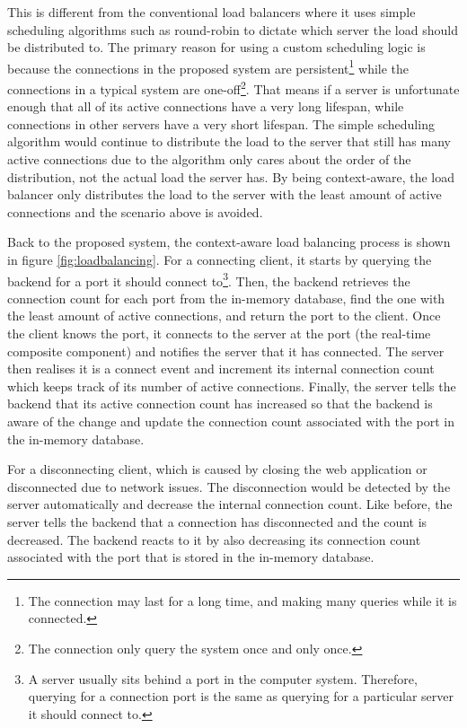 \documentclass[../thesis.tex]{subfiles}
\begin{document}
This is different from the conventional load balancers where it uses simple scheduling algorithms such as round-robin to dictate which server the load should be distributed to. The primary reason for using a custom scheduling logic is because the connections in the proposed system are persistent\footnote{The connection may last for a long time, and making many queries while it is connected.} while the connections in a typical system are one-off\footnote{The connection only query the system once and only once.}. That means if a server is unfortunate enough that all of its active connections have a very long lifespan, while connections in other servers have a very short lifespan. The simple scheduling algorithm would continue to distribute the load to the server that still has many active connections due to the algorithm only cares about the order of the distribution, not the actual load the server has. By being context-aware, the load balancer only distributes the load to the server with the least amount of active connections and the scenario above is avoided.

Back to the proposed system, the context-aware load balancing process is shown in figure \ref{fig:loadbalancing}. For a connecting client, it starts by querying the backend for a port it should connect to\footnote{A server usually sits behind a port in the computer system. Therefore, querying for a connection port is the same as querying for a particular server it should connect to.}. Then, the backend retrieves the connection count for each port from the in-memory database, find the one with the least amount of active connections, and return the port to the client. Once the client knows the port, it connects to the server at the port (the real-time composite component) and notifies the server that it has connected. The server then realises it is a connect event and increment its internal connection count which keeps track of its number of active connections. Finally, the server tells the backend that its active connection count has increased so that the backend is aware of the change and update the connection count associated with the port in the in-memory database.

For a disconnecting client, which is caused by closing the web application or disconnected due to network issues. The disconnection would be detected by the server automatically and decrease the internal connection count. Like before, the server tells the backend that a connection has disconnected and the count is decreased. The backend reacts to it by also decreasing its connection count associated with the port that is stored in the in-memory database.
\end{document}
